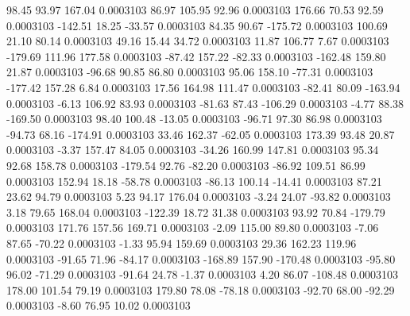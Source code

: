        98.45       93.97      167.04     0.0003103
       86.97      105.95       92.96     0.0003103
      176.66       70.53       92.59     0.0003103
     -142.51       18.25      -33.57     0.0003103
       84.35       90.67     -175.72     0.0003103
      100.69       21.10       80.14     0.0003103
       49.16       15.44       34.72     0.0003103
       11.87      106.77        7.67     0.0003103
     -179.69      111.96      177.58     0.0003103
      -87.42      157.22      -82.33     0.0003103
     -162.48      159.80       21.87     0.0003103
      -96.68       90.85       86.80     0.0003103
       95.06      158.10      -77.31     0.0003103
     -177.42      157.28        6.84     0.0003103
       17.56      164.98      111.47     0.0003103
      -82.41       80.09     -163.94     0.0003103
       -6.13      106.92       83.93     0.0003103
      -81.63       87.43     -106.29     0.0003103
       -4.77       88.38     -169.50     0.0003103
       98.40      100.48      -13.05     0.0003103
      -96.71       97.30       86.98     0.0003103
      -94.73       68.16     -174.91     0.0003103
       33.46      162.37      -62.05     0.0003103
      173.39       93.48       20.87     0.0003103
       -3.37      157.47       84.05     0.0003103
      -34.26      160.99      147.81     0.0003103
       95.34       92.68      158.78     0.0003103
     -179.54       92.76      -82.20     0.0003103
      -86.92      109.51       86.99     0.0003103
      152.94       18.18      -58.78     0.0003103
      -86.13      100.14      -14.41     0.0003103
       87.21       23.62       94.79     0.0003103
        5.23       94.17      176.04     0.0003103
       -3.24       24.07      -93.82     0.0003103
        3.18       79.65      168.04     0.0003103
     -122.39       18.72       31.38     0.0003103
       93.92       70.84     -179.79     0.0003103
      171.76      157.56      169.71     0.0003103
       -2.09      115.00       89.80     0.0003103
       -7.06       87.65      -70.22     0.0003103
       -1.33       95.94      159.69     0.0003103
       29.36      162.23      119.96     0.0003103
      -91.65       71.96      -84.17     0.0003103
     -168.89      157.90     -170.48     0.0003103
      -95.80       96.02      -71.29     0.0003103
      -91.64       24.78       -1.37     0.0003103
        4.20       86.07     -108.48     0.0003103
      178.00      101.54       79.19     0.0003103
      179.80       78.08      -78.18     0.0003103
      -92.70       68.00      -92.29     0.0003103
       -8.60       76.95       10.02     0.0003103
